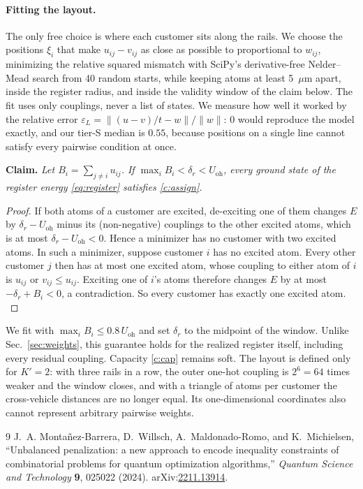 \documentclass[10pt]{article}
\begin{document}
\paragraph{Fitting the layout.} The only free choice is where each customer sits along the rails. We choose the
positions $\xi_i$ that make $u_{ij}-v_{ij}$ as close as possible to proportional to $w_{ij}$, minimizing the relative squared
mismatch with SciPy's derivative-free Nelder--Mead search from 40 random starts, while keeping atoms at least
5~$\mu$m apart, inside the register radius, and inside the validity window of the claim below. The fit uses only
couplings, never a list of states. We measure how well it worked by the relative error
$\varepsilon_L=\lVert(u-v)/t-w\rVert/\lVert w\rVert$: $0$ would reproduce the model exactly, and our tier-S median is
$0.55$, because positions on a single line cannot satisfy every pairwise condition at once.

\medskip\noindent\textbf{Claim.} \emph{Let $B_i=\sum_{j\ne i}u_{ij}$. If $\max_iB_i<\delta_r<U_{\mathrm{oh}}$, every
ground state of the register energy \eqref{eq:register} satisfies \eqref{c:assign}.}

\begin{proof}
If both atoms of a customer are excited, de-exciting one of them changes $E$ by $\delta_r-U_{\mathrm{oh}}$ minus its
(non-negative) couplings to the other excited atoms, which is at most $\delta_r-U_{\mathrm{oh}}<0$. Hence a minimizer has
no customer with two excited atoms. In such a minimizer, suppose customer $i$ has no excited atom. Every other
customer $j$ then has at most one excited atom, whose coupling to either atom of $i$ is $u_{ij}$ or $v_{ij}\le u_{ij}$.
Exciting one of $i$'s atoms therefore changes $E$ by at most $-\delta_r+B_i<0$, a contradiction. So every customer has
exactly one excited atom. $\qedhere$
\end{proof}

\noindent We fit with $\max_iB_i\le0.8\,U_{\mathrm{oh}}$ and set $\delta_r$ to the midpoint of the window. Unlike
Sec.~\ref{sec:weights}, this guarantee holds for the realized register itself, including every residual coupling.
Capacity \eqref{c:cap} remains soft. The layout is defined only for $K'=2$: with three rails in a row, the outer
one-hot coupling is $2^6=64$ times weaker and the window closes, and with a triangle of atoms per customer the
cross-vehicle distances are no longer equal. Its one-dimensional coordinates also cannot represent arbitrary pairwise
weights.

\begin{thebibliography}{9}
J.~A. Monta\~nez-Barrera, D.~Willsch, A.~Maldonado-Romo, and K.~Michielsen,
``Unbalanced penalization: a new approach to encode inequality constraints of combinatorial problems
for quantum optimization algorithms,''
\emph{Quantum Science and Technology} \textbf{9}, 025022 (2024).
arXiv:\href{https://arxiv.org/abs/2211.13914}{2211.13914}.
\end{thebibliography}
\end{document}
